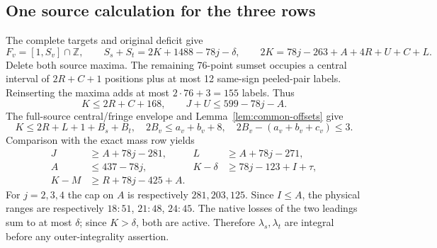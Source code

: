 \documentclass[11pt,letterpaper]{article}
\theoremstyle{definition}\newtheorem{definition}[theorem]{Definition}
\begin{document}
\subsection{One source calculation for the three rows}
The complete targets and original deficit give
\[
 F_v=[1,S_v]\cap\mathbb Z,\qquad S_s+S_t=2K+1488-78j-\delta,
 \qquad 2K=78j-263+A+4R+U+C+L.
\]
Delete both source maxima. The remaining 76-point sumset occupies a central interval of $2R+C+1$ positions plus at most 12 same-sign peeled-pair labels. Reinserting the maxima adds at most $2\cdot76+3=155$ labels. Thus
\[
 K\le2R+C+168,\qquad J+U\le599-78j-A.
\]
The full-source central/fringe envelope and Lemma~\ref{lem:common-offsets} give
\[
 K\le2R+L+1+B_s+B_t,\quad
 2B_v\le a_v+b_v+8,\quad 2B_v-(a_v+b_v+c_v)\le3.
\]
Comparison with the exact mass row yields
\begin{equation}\label{eq:z-common-source}
\begin{aligned}
 J&\ge A+78j-281, &L&\ge A+78j-271,\\
 A&\le437-78j, &K-\delta&\ge78j-123+I+\tau,\\
 K-M&\ge R+78j-425+A.&&
\end{aligned}
\end{equation}
For $j=2,3,4$ the cap on $A$ is respectively $281,203,125$.
Since $I\le A$, the physical ranges are respectively $18\!:\!51$, $21\!:\!48$, $24\!:\!45$.
The native losses of the two leadings sum to at most $\delta$; since $K>\delta$, both are active. Therefore $\lambda_s,\lambda_t$ are integral before any outer-integrality assertion.
\end{document}
